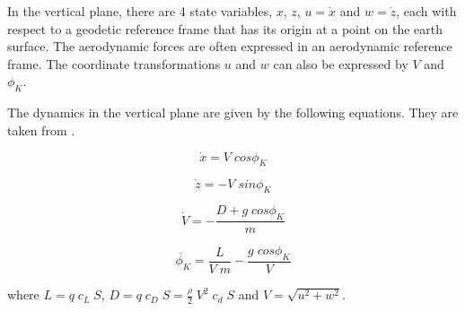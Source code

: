 
In the vertical plane, there are 4 state variables, $x$, $z$, $u=\dot{x}$ and $w=\dot{z}$, each with respect to a geodetic reference frame that has its origin at a point on the earth surface. The aerodynamic forces are often expressed in an aerodynamic reference frame. The coordinate transformations $u$ and $w$ can also be expressed by $V$ and $\phi_K$.

The dynamics in the vertical plane are given by the following equations. They are taken from \cite{Fichter2009}. 

\begin{equation}
\dot{x} = V \; cos\phi_K
\end{equation}

\begin{equation}
\dot{z} = - V \; sin\phi_K
\end{equation}

\begin{equation}
\dot{V} = -\frac{D + g \; cos\phi_K}{m}
\end{equation}

\begin{equation}
\dot{\phi_K} = \frac{L}{V \; m} - \frac{g \; cos{\phi_K}}{V} 
\label{eq:dotgamma}
\end{equation}

where $L = q \; c_L \; S$, $D = q \; c_D \; S = \frac{\rho}{2} \; V^2 \; c_d \; S$ and $V=\sqrt{u^2+w^2}$.

